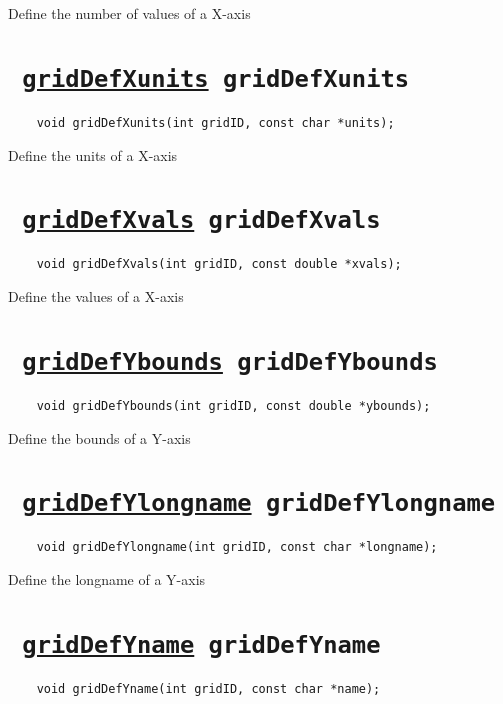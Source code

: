 Define the number of values of a X-axis
\ifpdfoutput{}{(\ref{gridDefXsize})}


\section*{\tt 
\ifpdf
\hyperref[gridDefXunits]{gridDefXunits}
\else
gridDefXunits
\fi
}
\begin{verbatim}
    void gridDefXunits(int gridID, const char *units);
\end{verbatim}

Define the units of a X-axis
\ifpdfoutput{}{(\ref{gridDefXunits})}


\section*{\tt 
\ifpdf
\hyperref[gridDefXvals]{gridDefXvals}
\else
gridDefXvals
\fi
}
\begin{verbatim}
    void gridDefXvals(int gridID, const double *xvals);
\end{verbatim}

Define the values of a X-axis
\ifpdfoutput{}{(\ref{gridDefXvals})}


\section*{\tt 
\ifpdf
\hyperref[gridDefYbounds]{gridDefYbounds}
\else
gridDefYbounds
\fi
}
\begin{verbatim}
    void gridDefYbounds(int gridID, const double *ybounds);
\end{verbatim}

Define the bounds of a Y-axis
\ifpdfoutput{}{(\ref{gridDefYbounds})}


\section*{\tt 
\ifpdf
\hyperref[gridDefYlongname]{gridDefYlongname}
\else
gridDefYlongname
\fi
}
\begin{verbatim}
    void gridDefYlongname(int gridID, const char *longname);
\end{verbatim}

Define the longname of a Y-axis
\ifpdfoutput{}{(\ref{gridDefYlongname})}


\section*{\tt 
\ifpdf
\hyperref[gridDefYname]{gridDefYname}
\else
gridDefYname
\fi
}
\begin{verbatim}
    void gridDefYname(int gridID, const char *name);
\end{verbatim}

